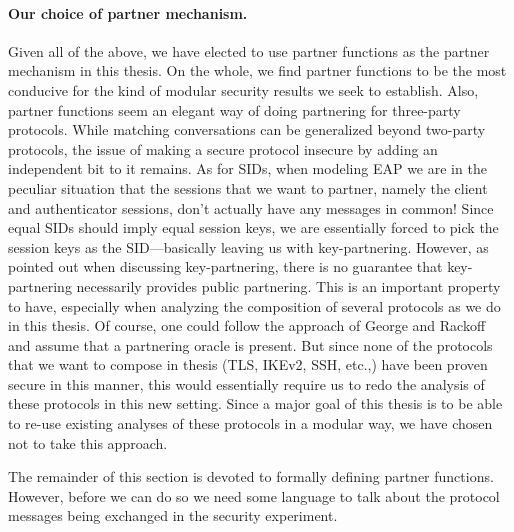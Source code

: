 \paragraph{Our choice of partner mechanism.}
Given all of the above,
we have elected to use partner functions as the partner mechanism in this thesis.
On the whole,
we find partner functions to be the most conducive for the kind of modular security results we seek to establish.
Also,
partner functions seem an elegant way of doing partnering for three-party protocols.
While matching conversations can be generalized beyond two-party protocols,
the issue of making a secure protocol insecure by adding an independent bit to it remains.
As for SIDs,
when modeling EAP we are in the peculiar situation that the sessions that we want to partner,
namely the client and authenticator sessions,
don't actually have any messages in common!
Since equal SIDs should imply equal session keys,
we are essentially forced to pick the session keys as the SID---basically leaving us with key-partnering.
However,
as pointed out when discussing key-partnering,
there is no guarantee that key-partnering necessarily provides public partnering.
This is an important property to have,
especially when analyzing the composition of several protocols as we do in this thesis.
Of course,
one could follow the approach of George and Rackoff~\cite{EPRINT:GeoRac13} and assume that a partnering oracle is present.
But since none of the protocols that we want to compose in thesis (TLS, IKEv2, SSH, etc.,) have been proven secure in this manner,
this would essentially require us to redo the analysis of these protocols in this new setting.
Since a major goal of this thesis is to be able to re-use existing analyses of these protocols in a modular way,
we have chosen not to take this approach.


The remainder of this section is devoted to formally defining partner functions.
However,
before we can do so we need some language to talk about the protocol messages being exchanged in the security experiment.




